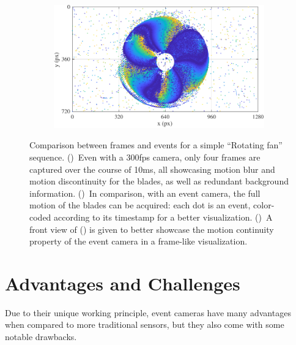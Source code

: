 \begin{figure}
\begin{subfigure}{0.475\linewidth}
    \caption{}\label{subfig:evtcams:fan_rgb_vs_evts:evts}
  \end{subfigure}\\
  \vspace{3mm}
  \begin{subfigure}{0.475\linewidth}
    \centering
    \includegraphics[width=\linewidth]{mainmatter/figures/2_event_cameras/fan_rgb_vs_evts/fan_evts/plotted_events_front.pdf}
    \caption{}\label{subfig:evtcams:fan_rgb_vs_evts:evts_front}
  \end{subfigure}
  \caption{Comparison between frames and events for a simple ``Rotating fan'' sequence. ()~Even with a 300\acrshort{fps} camera, only four frames are captured over the course of 10ms, all showcasing motion blur and motion discontinuity for the blades, as well as redundant background information. ()~In comparison, with an event camera, the full motion of the blades can be acquired: each dot is an event, color-coded according to its timestamp for a better visualization. ()~A front view of () is given to better showcase the motion continuity property of the event camera in a frame-like visualization.}\label{fig:evtcams:fan_rgb_vs_evts}
\end{figure}

\section{Advantages and Challenges}
Due to their unique working principle, event cameras have many advantages when compared to more traditional sensors, but they also come with some notable drawbacks.

